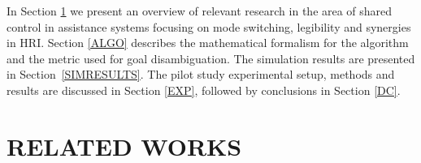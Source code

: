 \documentclass[conference]{IEEEtran}
\begin{document}

In Section \ref{RW} we present an overview of relevant research in the area of shared control in assistance systems focusing on mode switching, legibility and synergies in HRI. Section \ref{ALGO} describes the mathematical formalism for the algorithm and the metric used for goal disambiguation. The simulation results are presented in Section~\ref{SIMRESULTS}. The pilot study experimental setup, methods and results are discussed in Section \ref{EXP}, followed by conclusions in Section \ref{DC}.

\section{RELATED WORKS}\label{RW} 
\end{document}
